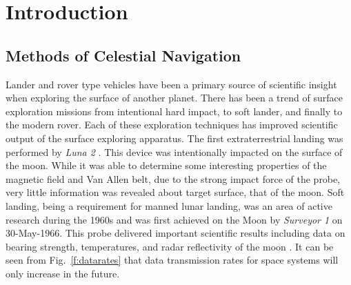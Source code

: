 \documentclass[12pt,a4paper]{book}
\begin{document}
\mainmatter
\chapter{Introduction}
\section{Methods of Celestial Navigation}
Lander and rover type vehicles have been a primary source of scientific insight when exploring the surface of another planet. There has been a trend of surface exploration missions from intentional hard impact, to soft lander, and finally to the modern rover.  Each of these exploration techniques has improved scientific output of the surface exploring apparatus.  The first extraterrestrial landing was performed by \textit{Luna 2} \cite{b:luna}.  This device was intentionally impacted on the surface of the moon.  While it was able to determine some interesting properties of the magnetic field and Van Allen belt, due to the strong impact force of the probe, very little information was revealed about target surface, that of the moon.  Soft landing, being a requirement for manned lunar landing, was an area of active research during the 1960s and was first achieved on the Moon by \textit{Surveyor 1} on 30-May-1966.  This probe delivered important scientific results including data on bearing strength, temperatures, and radar reflectivity of the moon \cite{b:surveyor}.  It can be seen from Fig.~\ref{f:datarates} that data transmission rates for space systems will only increase in the future.  
\end{document}
